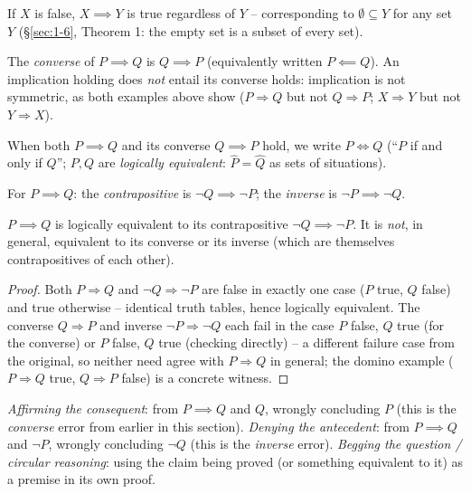 \documentclass[11pt]{article}
\begin{document}
\begin{note}
If $X$ is false, $X \implies Y$ is true regardless of $Y$ -- corresponding to $\emptyset \subseteq Y$ for any set $Y$ (\S\ref{sec:1-6}, Theorem 1: the empty set is a subset of every set).
\end{note}

\begin{definition}[Converse]
The \emph{converse} of $P \implies Q$ is $Q \implies P$ (equivalently written $P \impliedby Q$). An implication holding does \emph{not} entail its converse holds: implication is not symmetric, as both examples above show ($P\Rightarrow Q$ but not $Q \Rightarrow P$; $X \Rightarrow Y$ but not $Y \Rightarrow X$).
\end{definition}

\begin{definition}[Biconditional]
When both $P \implies Q$ and its converse $Q \implies P$ hold, we write $P \iff Q$ (``$P$ if and only if $Q$''; $P,Q$ are \emph{logically equivalent}: $\hat P = \hat Q$ as sets of situations).
\end{definition}

\begin{definition}
For $P \implies Q$: the \emph{contrapositive} is $\neg Q \implies \neg P$; the \emph{inverse} is $\neg P \implies \neg Q$.
\end{definition}

\begin{theorem}
$P \implies Q$ is logically equivalent to its contrapositive $\neg Q \implies \neg P$. It is \emph{not}, in general, equivalent to its converse or its inverse (which are themselves contrapositives of each other).
\end{theorem}
\begin{proof}
Both $P\Rightarrow Q$ and $\neg Q \Rightarrow \neg P$ are false in exactly one case ($P$ true, $Q$ false) and true otherwise -- identical truth tables, hence logically equivalent. The converse $Q\Rightarrow P$ and inverse $\neg P \Rightarrow \neg Q$ each fail in the case $P$ false, $Q$ true (for the converse) or $P$ false, $Q$ true (checking directly) -- a different failure case from the original, so neither need agree with $P \Rightarrow Q$ in general; the domino example ($P\Rightarrow Q$ true, $Q \Rightarrow P$ false) is a concrete witness.
\end{proof}

\begin{note}
\emph{Affirming the consequent}: from $P\implies Q$ and $Q$, wrongly concluding $P$ (this is the \emph{converse} error from earlier in this section). \emph{Denying the antecedent}: from $P\implies Q$ and $\neg P$, wrongly concluding $\neg Q$ (this is the \emph{inverse} error). \emph{Begging the question / circular reasoning}: using the claim being proved (or something equivalent to it) as a premise in its own proof.
\end{note}
\end{document}
